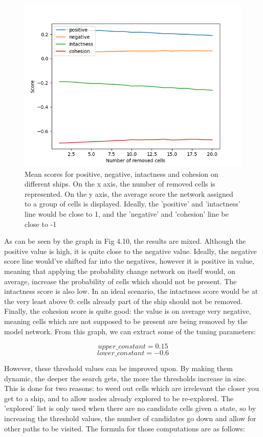 \documentclass{l4proj}
\begin{document}
\begin{figure}[h!]
\centering
\includegraphics[width=0.8\linewidth]{dissertation/images/graphs/n_removed_cells_score_probability_analysis.png}
\caption{Mean scores for positive, negative, intactness and cohesion on different ships. On the x axis, the number of removed cells is represented. On the y axis, the average score the network assigned to a group of cells is displayed. Ideally, the 'positive' and 'intactness' line would be close to 1, and the 'negative' and 'cohesion' line be close to -1}
\label{fig:subim1}
\end{figure}

As can be seen by the graph in Fig 4.10, the results are mixed. Although the positive value is high, it is quite close to the negative value. Ideally, the negative score line would've shifted far into the negatives, however it is positive in value, meaning that applying the probability change network on itself would, on average, increase the probability of cells which should not be present. The intactness score is also low. In an ideal scenario, the intactness score would be at the very least above 0: cells already part of the ship should not be removed. Finally, the cohesion score is quite good: the value is on average very negative, meaning cells which are not supposed to be present are being removed by the model network. From this graph, we can extract some of the tuning parameters:

\[ upper\_constant = 0.15 \]
\[ lower\_constant = -0.6 \]

However, these threshold values can be improved upon. By making them dynamic, the deeper the search gets, the more the thresholds increase in size. This is done for two reasons: to weed out cells which are irrelevant the closer you get to a ship, and to allow nodes already explored to be re-explored. The 'explored' list is only used when there are no candidate cells given a state, so by increasing the threshold values, the number of candidates go down and allow for other paths to be visited. The formula for those computations are as follows:
\end{document}
